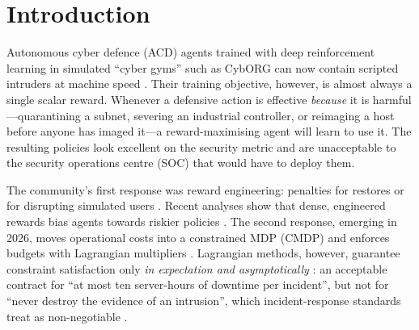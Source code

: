\documentclass[10pt]{article}
\begin{document}
\section{Introduction}
Autonomous cyber defence (ACD) agents trained with deep reinforcement learning
in simulated ``cyber gyms'' such as CybORG \citep{standen2021cyborg,kiely2025cage4}
can now contain scripted intruders at machine speed
\citep{foley2022autonomous,vyas2023review,palmer2023survey}. Their training
objective, however, is almost always a single scalar reward. Whenever a
defensive action is effective \emph{because} it is harmful---quarantining a
subnet, severing an industrial controller, or reimaging a host before anyone
has imaged it---a reward-maximising agent will learn to use it. The resulting
policies look excellent on the security metric and are unacceptable to the
security operations centre (SOC) that would have to deploy them.

The community's first response was reward engineering: penalties for restores
or for disrupting simulated users \citep{kiely2025cage4}. Recent analyses show
that dense, engineered rewards bias agents towards riskier policies
\citep{bates2025lessismore,bates2026beyond}. The second response, emerging in
2026, moves operational costs into a constrained MDP (CMDP)
\citep{altman1999cmdp} and enforces budgets with Lagrangian multipliers
\citep{acd3gat2026}. Lagrangian methods, however, guarantee constraint
satisfaction only \emph{in expectation and asymptotically}
\citep{ray2019safetygym,stooke2020pid}: an acceptable contract for ``at most
ten server-hours of downtime per incident'', but not for ``never destroy the
evidence of an intrusion'', which incident-response standards treat as
non-negotiable \citep{nist80086,nist80061r3,rfc3227}.
\end{document}
